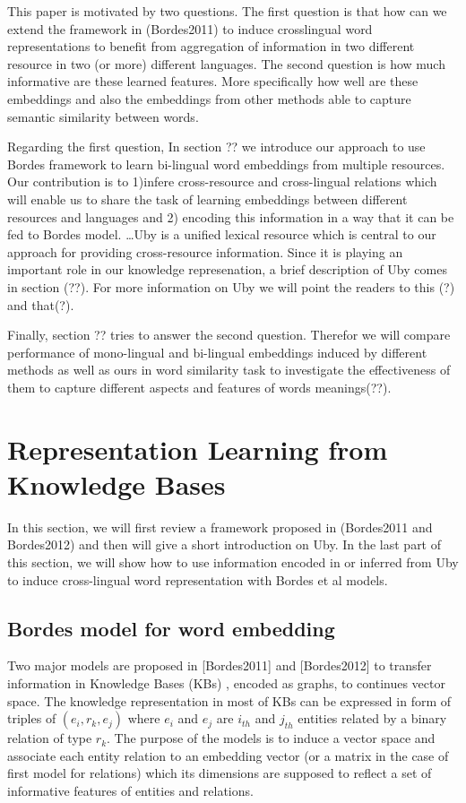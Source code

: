 \documentclass[11pt]{article}
\begin{document}
 This paper is motivated by two questions. The first question is that how can we extend the framework in (Bordes2011)
  to induce crosslingual word representations to benefit from aggregation of information in two 
  different resource in two (or more) different languages.
  The second question is how much informative are these learned features. More specifically
   how well are these embeddings and also the embeddings from other methods able
  to capture semantic similarity between words.
 
 Regarding the first question, In section ?? we introduce our approach to use Bordes framework to learn
 bi-lingual word embeddings from multiple resources. Our contribution is to
 1)infere cross-resource and cross-lingual relations which will enable us to
 share the task of learning embeddings between different resources and languages and 2) encoding this
 information in a way that it can be fed to Bordes model. \ldots Uby is a unified lexical resource which is central
 to our approach for providing cross-resource information. Since it is playing an important role in our knowledge represenation, 
 a brief description of Uby comes in section (??). For more information on Uby we will point the readers 
 to this (?) and that(?).
 
 Finally, section ?? tries to answer the second question. Therefor we will compare performance of 
 mono-lingual and bi-lingual embeddings induced by different methods as well as ours in 
 word similarity task to investigate the effectiveness of them to
 capture different aspects and features of words meanings(??).
 
 

\section{Representation Learning from Knowledge Bases}

In this section, we will first review a framework proposed in (Bordes2011 and Bordes2012) and then will give  
a short introduction on Uby. In the last part of this section,
 we will show how to use information encoded in or inferred from Uby to induce cross-lingual word representation 
with Bordes et al models.


\subsection{Bordes model for word embedding}
\label{ssect:bordes}
Two major models are proposed in [Bordes2011] and [Bordes2012] to transfer information in Knowledge Bases (KBs)
, encoded as graphs, to continues vector space. The knowledge representation in most of KBs can be expressed
 in form of triples of $(e_{i},r_{k} , e_{j} )$ where $e_{i}$ and $e_{j}$ are $i_{th}$ and $j_{th}$ entities related
 by a binary relation of type $r_{k}$. The purpose of the models is to induce a vector space and associate
  each entity relation to an embedding vector (or a matrix in the case of first model for relations)
   which its dimensions are supposed to reflect a set of informative features of entities and relations.
   
\end{document}

